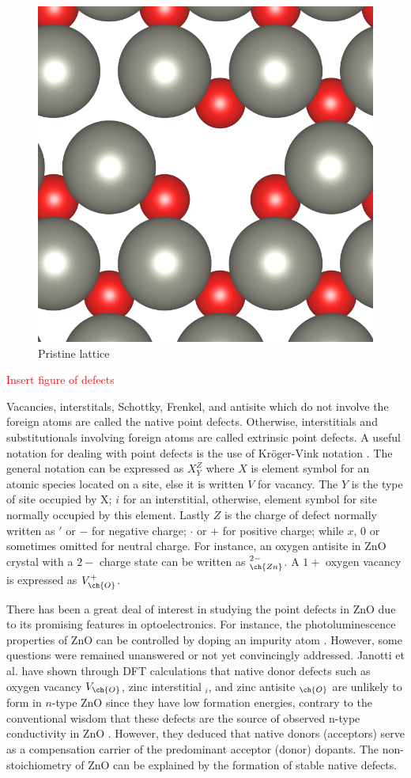 \begin{figure}[tbh!]
	\centering
	\includegraphics[width=0.48\linewidth]{"images/rrl/schottky"}
	\caption[Pristine lattice]{Pristine lattice}
\end{figure}

\textcolor{red}{Insert figure of defects}

Vacancies, interstitals, Schottky, Frenkel, and antisite which do not involve the foreign atoms are called the native point defects. Otherwise, interstitials and substitutionals involving foreign atoms are called extrinsic point defects. A useful notation for dealing with point defects is the use of  Kröger-Vink notation \citep{Kroeger1964}. The general notation can  be expressed as  $X_Y^Z$ where $X$ is element symbol for an atomic species located on a site, else it is written $V$ for vacancy. The $Y$ is the type of site occupied by X; $i$ for an interstitial, otherwise, element symbol for site normally occupied by this element. Lastly $Z$ is the charge of defect normally written as $'$ or $-$ for negative charge; $\cdot$ or $+$ for positive charge; while $x$, $0$ or sometimes omitted for neutral charge. For instance, an oxygen antisite in ZnO crystal with a $2-$ charge state can be written as $_{\ch{Zn}}^{2-}$. A $1+$ oxygen vacancy is expressed as $V_{\ch{O}}^{+}$.

There has been a great deal of interest in studying the point defects in ZnO due to its promising features in optoelectronics. For instance, the photoluminescence properties of ZnO can be controlled by doping an impurity atom \citep{Musavi2019}.  However, some questions were remained unanswered or not yet convincingly addressed. Janotti et al. \citep{Janotti2007} have shown through DFT calculations that native donor defects such as oxygen vacancy $V_{\ch{O}}$, zinc interstitial $_i$, and zinc antisite $_{\ch{O}}$  are unlikely to form in $n$-type ZnO since they have low formation energies, contrary to the conventional wisdom that these defects are the source of  observed n-type conductivity in ZnO \citep{Harrison1954,Thomas1957,Hausmann1973,Hagemark1976}. However, they deduced that native donors (acceptors) serve as a compensation carrier of the predominant acceptor (donor) dopants.  The non-stoichiometry of ZnO can be explained by the formation of stable native defects.


